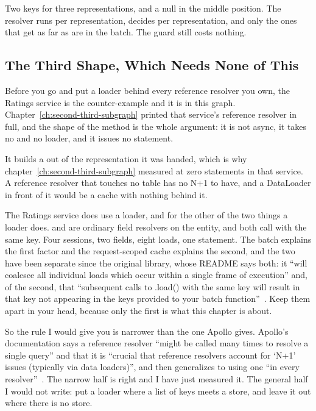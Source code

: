 Two keys for three representations, and a null in the middle position. The
resolver runs per representation, decides per representation, and only the ones
that get as far as  are in the batch. The guard still costs
nothing.

\subsection{The Third Shape, Which Needs None of This}

%
Before you go and put a loader behind every reference resolver you own, the
Ratings service is the counter-example and it is in this graph.
Chapter~\ref{ch:second-third-subgraph} printed that service's reference
resolver in full, and the shape of the method is the whole argument: it is not
async, it takes no  and no loader, and it issues no statement.

%
It builds a 
out of the representation it was handed, which is why
chapter~\ref{ch:second-third-subgraph} measured  at zero
statements in that service. A reference resolver that touches no table has no
N+1 to have, and a DataLoader in front of it would be a cache with nothing
behind it.

%
The Ratings service does use a loader, and for the other of the two things a
loader does.  and  are ordinary field
resolvers on the entity, and both call  with the same key. Four
sessions, two fields, eight loads, one statement. The batch explains the first
factor and the request-scoped cache explains the second, and the two have been
separate since the original library, whose README says both: it
\enquote{will coalesce all individual loads which occur within a single frame of
execution} and, of the second, that
\enquote{subsequent calls to .load() with the same key will result in that key
not appearing in the keys provided to your batch
function}~\autocite{dataloaderjs}. Keep them apart in your head, because only
the first is what this chapter is about.

%
So the rule I would give you is narrower than the one Apollo gives. Apollo's
documentation says a reference resolver
\enquote{might be called many times to resolve a single query} and that it is
\enquote{crucial that reference resolvers account for \enquote{N+1} issues
(typically via data loaders)}, and then generalizes to using one
\enquote{in every resolver}~\autocite{apolloentities, apollonplusone}. The
narrow half is right and I have just measured it. The general half I would not
write: put a loader where a list of keys meets a store, and leave it out where
there is no store.
%
